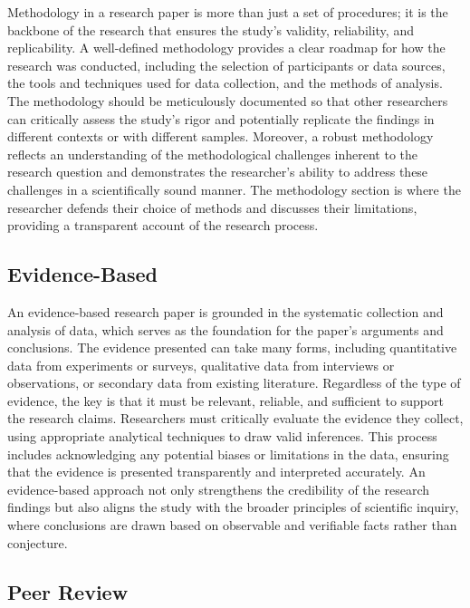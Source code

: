 \documentclass[
]{book}
\begin{document}
Methodology in a research paper is more than just a set of procedures; it is the backbone of the research that ensures the study's validity, reliability, and replicability. A well-defined methodology provides a clear roadmap for how the research was conducted, including the selection of participants or data sources, the tools and techniques used for data collection, and the methods of analysis. The methodology should be meticulously documented so that other researchers can critically assess the study's rigor and potentially replicate the findings in different contexts or with different samples. Moreover, a robust methodology reflects an understanding of the methodological challenges inherent to the research question and demonstrates the researcher's ability to address these challenges in a scientifically sound manner. The methodology section is where the researcher defends their choice of methods and discusses their limitations, providing a transparent account of the research process.

\subsection*{Evidence-Based}\label{evidence-based}

An evidence-based research paper is grounded in the systematic collection and analysis of data, which serves as the foundation for the paper's arguments and conclusions. The evidence presented can take many forms, including quantitative data from experiments or surveys, qualitative data from interviews or observations, or secondary data from existing literature. Regardless of the type of evidence, the key is that it must be relevant, reliable, and sufficient to support the research claims. Researchers must critically evaluate the evidence they collect, using appropriate analytical techniques to draw valid inferences. This process includes acknowledging any potential biases or limitations in the data, ensuring that the evidence is presented transparently and interpreted accurately. An evidence-based approach not only strengthens the credibility of the research findings but also aligns the study with the broader principles of scientific inquiry, where conclusions are drawn based on observable and verifiable facts rather than conjecture.

\subsection*{Peer Review}\label{peer-review}
\end{document}
